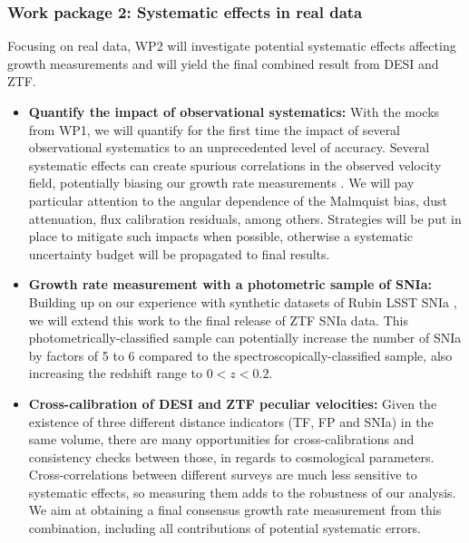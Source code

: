 \subsubsection*{Work package 2: Systematic effects in real data}

Focusing on real data, WP2 will investigate potential systematic effects 
affecting growth measurements and will yield the final combined result from 
DESI and ZTF. 

\begin{itemize}
  \item \textbf{Quantify the impact of observational systematics:}
    With the mocks from WP1, 
    we will quantify for the first time the impact 
    of several observational systematics to an unprecedented level of accuracy.
    Several systematic effects can create spurious correlations in the observed velocity field, 
    potentially biasing our growth rate measurements \cite{rossCompletedSDSSIVExtended2020}. 
    We will pay particular attention to 
    the angular dependence of the Malmquist bias, dust attenuation, flux calibration residuals, 
    among others. 
    Strategies will be put in place to mitigate such impacts when possible, 
    otherwise a systematic uncertainty budget will be propagated to final results.

  \item \textbf{Growth rate measurement with a photometric sample of SNIa:}
    Building up on our experience with synthetic datasets of Rubin LSST SNIa
    \cite{rosselliForecastGrowthrateMeasurement2025a,carreresTypeIaSupernova2025}, 
    we will extend this work to the final release of ZTF SNIa data. 
    This photometrically-classified sample can potentially increase the 
    number of SNIa by factors of 5 to 6 compared to the spectroscopically-classified sample,
    also increasing the redshift range to $0< z< 0.2$.  

  \item \textbf{Cross-calibration of DESI and ZTF peculiar velocities:}
    Given the existence of three different distance indicators (TF, FP and SNIa) in the same 
    volume, there are many opportunities for cross-calibrations and consistency checks between 
    those, in regards to cosmological parameters. Cross-correlations between different surveys
    are much less sensitive to systematic effects, so measuring them adds to the robustness of
    our analysis. We aim at obtaining a final consensus growth rate measurement from this combination, 
    including all contributions of potential systematic errors. 

\end{itemize}

